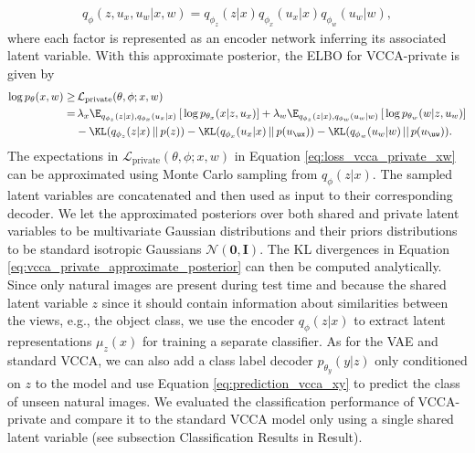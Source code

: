\begin{align}\label{eq:vcca_private_approximate_posterior}
    q_{\phi}(z, u_{x}, u_{w} | x, w) = q_{\phi_{z}}(z | x) q_{\phi_{x}}(u_{x} | x) q_{\phi_{w}}(u_{w} | w),
\end{align}
where each factor is represented as an encoder network inferring its associated latent variable. With this approximate posterior, the ELBO for VCCA-private is given by
\begin{align}
    \begin{split} \label{eq:loss_vcca_private_xw}
        \log p_{\theta}(x, w) \geq & \, \mathcal{L}_{\text{private}}(\theta, \phi; x, w) \\ 
        = & \, \lambda_{x} \E_{q_{\phi_{z}}(z|x), q_{\phi_{x}}(u_{x}|x)}\left[\, \log p_{\theta_{x}}(x | z, u_{x}) \right] + \lambda_{w}  \E_{q_{\phi_{z}}(z|x), q_{\phi_{w}}(u_{w}|w)}\left[\, \log p_{\theta_{w}}(w | z, u_{w}) \right] \\ 
        & - \KL(q_{\phi_{z}}(z|x)\,||\,p(z)) - \KL(q_{\phi_{x}}(u_{x}|x)\,||\,p(u_{\ux})) - \KL(q_{\phi_{w}}(u_{w} |w)\,||\,p(u_{\uw})) .
    \end{split}
\end{align}
The expectations in $\mathcal{L}_{\text{private}}(\theta, \phi; x, w)$ in Equation \ref{eq:loss_vcca_private_xw} can be approximated using Monte Carlo sampling from $q_{\phi}(z | x)$. The sampled latent variables are concatenated and then used as input to their corresponding decoder. We let the approximated posteriors over both shared and private latent variables to be multivariate Gaussian distributions and their priors distributions to be standard isotropic Gaussians $\mathcal{N}(\bm{0}, \mathbf{I})$. The KL divergences in Equation \ref{eq:vcca_private_approximate_posterior} can then be computed analytically. 
Since only natural images are present during test time and because the shared latent variable $z$ since it should contain information about similarities between the views, e.g., the object class, we use the encoder $q_{\phi}(z|x)$ to extract latent representations $\mu_{z}(x)$ for training a separate classifier. As for the VAE and standard VCCA, we can also add a class label decoder $p_{\theta_{y}}(y | z)$ only conditioned on $z$ to the model and use Equation \ref{eq:prediction_vcca_xy} to predict the class of unseen natural images. We evaluated the classification performance of VCCA-private and compare it to the standard VCCA model only using a single shared latent variable (see subsection Classification Results in Result). %


